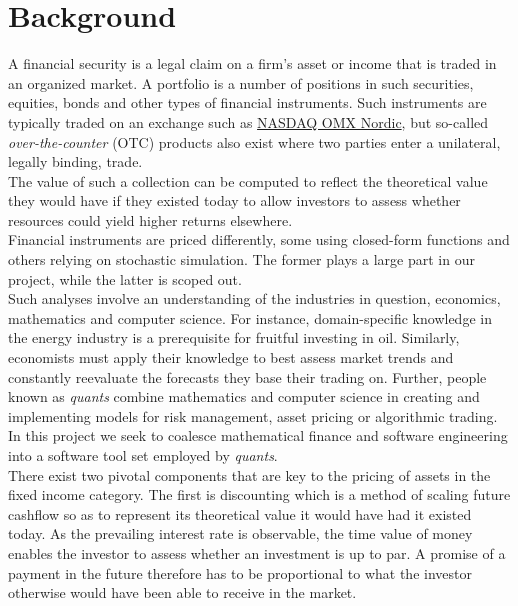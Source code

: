 \chapter{Background}

A financial security is a legal claim on a firm's asset or income 
that is traded in an organized market\cite{alexander2008market}.
A portfolio is  a number of positions in such securities, equities, bonds
and other types of financial instruments. 
Such instruments are typically traded on an exchange such as 
\href{http://www.nasdaqomxnordic.com/}{NASDAQ OMX Nordic}, but so-called
\emph{over-the-counter} (OTC) products also exist where two parties enter
a unilateral, legally binding, trade.\\
The value of such a collection can be computed to reflect the theoretical 
value they would have if they existed today to allow investors to assess
whether resources could yield higher returns elsewhere.\\
Financial instruments are priced differently, some using closed-form functions 
and others relying on stochastic simulation. The former plays a large part in
our project, while the latter is scoped out.\\

Such analyses involve an understanding of the industries in question,
economics, mathematics and computer science. For instance,
domain-specific knowledge in the energy 
industry is a prerequisite for fruitful investing in oil. Similarly, economists 
must apply their knowledge to best assess market trends and constantly reevaluate
the forecasts they base their trading on.
Further, people known as \emph{quants} combine mathematics and computer science
in creating and implementing models for risk management, asset pricing or 
algorithmic trading.\\
In this project we seek to coalesce mathematical finance and software engineering
into a software tool set employed by \emph{quants}.\\

There exist two pivotal components that are key to the pricing of assets in the
fixed income category. The first is discounting which is a method of scaling
future cashflow so as to represent its  theoretical value it would have had
it existed today.
As the prevailing interest rate is observable, the time value of money enables 
the investor to assess whether an investment is up to par. A promise of a 
payment in the future therefore has to be proportional to what the investor 
otherwise would have been able to receive in the market.\\

